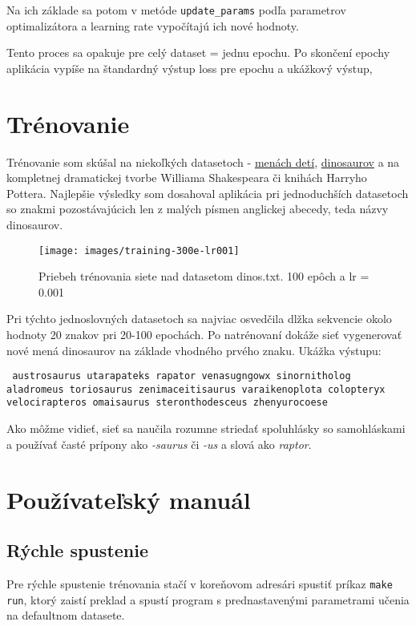 \documentclass[12pt,a4paper]{article}
\begin{document}
	Na ich základe sa potom v metóde \texttt{update\_params} podľa parametrov optimalizátora a learning rate vypočítajú ich nové hodnoty.
	
	Tento proces sa opakuje pre celý dataset = jednu epochu. Po skončení epochy aplikácia vypíše na štandardný výstup loss pre epochu a ukážkový výstup,

\section{Trénovanie}
	Trénovanie som skúšal na niekoľkých datasetoch - \href{https://www.kaggle.com/kaggle/us-baby-names?select=NationalNames.csv}{menách detí}, \href{https://www.kaggle.com/kumazaki98/dinosaur-list}{dinosaurov} a na kompletnej dramatickej tvorbe Williama Shakespeara či knihách Harryho Pottera. Najlepšie výsledky som dosahoval aplikácia pri jednoduchších datasetoch so znakmi pozostávajúcich len z malých písmen anglickej abecedy, teda názvy dinosaurov.
	
	\begin{figure}[h]
		\centering
		\texttt{[image: images/training-300e-lr001]}
		\caption{Priebeh trénovania siete nad datasetom dinos.txt. 100 epôch a lr = 0.001}
		\label{fig:training-100e-lr0001}
	\end{figure}
	
	Pri týchto jednoslovných datasetoch sa najviac osvedčila dlžka sekvencie okolo hodnoty 20 znakov pri 20-100 epochách. Po natrénovaní dokáže sieť vygenerovať nové mená dinosaurov na základe vhodného prvého znaku. Ukážka výstupu:
	
	\texttt{
		austrosaurus
		utarapateks
		rapator
		venasugngowx
		sinornitholog
		aladromeus
		toriosaurus
		zenimaceitisaurus
		varaikenoplota
		colopteryx
		velocirapteros
		omaisaurus
		steronthodesceus
		zhenyurocoese 
	}

	Ako môžme vidieť, sieť sa naučila rozumne striedať spoluhlásky so samohláskami a používať časté prípony ako \textit{-saurus} či \textit{-us} a slová ako \textit{raptor}.

\section{Používateľský manuál}
	\subsection{Rýchle spustenie}
	Pre rýchle spustenie trénovania stačí v koreňovom adresári spustiť príkaz \texttt{make run}, ktorý zaistí preklad a spustí program s prednastavenými parametrami učenia na defaultnom datasete.
	
\end{document}
